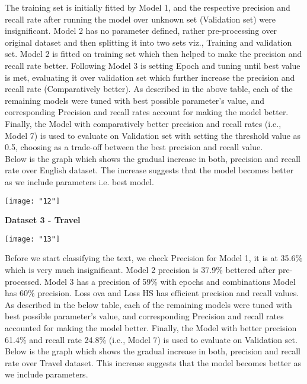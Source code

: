 \documentclass[12pt]{article}
\begin{document}
\noindent The training set is initially fitted by Model 1, and the respective precision and recall rate after running the model over unknown set (Validation set) were insignificant. Model 2 has no parameter defined, rather pre-processing over original dataset and then splitting it into two sets viz., Training and validation set. Model 2 is fitted on training set which then helped to make the precision and recall rate better. Following Model 3 is setting Epoch and tuning until best value is met, evaluating it over validation set which further increase the precision and recall rate (Comparatively better). As described in the above table, each of the remaining models were tuned with best possible parameter’s value, and corresponding Precision and recall rates account for making the model better. Finally, the Model with comparatively better precision and recall rates (i.e., Model 7) is used to evaluate on Validation set with setting the threshold value as 0.5, choosing as a trade-off between the best precision and recall value.\\
\noindent Below is the graph which shows the gradual increase in both, precision and recall rate over English dataset. The increase suggests that the model becomes better as we include parameters i.e. best model.


\begin{center}
	\begin{minipage}{\linewidth}
		\centering
		\texttt{[image: "12"]}
		
	\end{minipage}
\end{center}
\textbf{Dataset 3 - Travel}

\begin{center}
	\begin{minipage}{\linewidth}
		\centering
		\texttt{[image: "13"]}
		
	\end{minipage}
\end{center}

\noindent Before we start classifying the text, we check Precision for Model 1, it is at 35.6\% which is very much insignificant. Model 2 precision is 37.9\% bettered after pre-processed.
Model 3 has a precision of 59\% with epochs and combinations Model has 60\% precision. Loss ova and Loss HS has efficient precision and recall values.
As described in the below table, each of the remaining models were tuned with best possible parameter’s value, and corresponding Precision and recall rates accounted for making the model better. Finally, the Model with better precision 61.4\% and recall rate 24.8\% (i.e., Model 7) is used to evaluate on Validation set.\\
\noindent Below is the graph which shows the gradual increase in both, precision and recall rate over Travel dataset. This increase suggests that the model becomes better as we include parameters.
\end{document}

